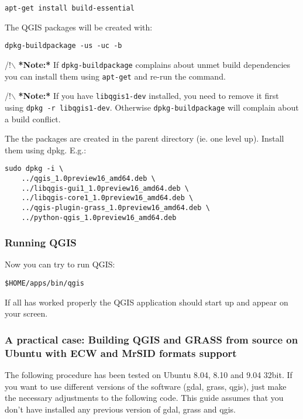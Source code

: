 \begin{verbatim}
apt-get install build-essential
\end{verbatim}

The QGIS packages will be created with:

\begin{verbatim}
dpkg-buildpackage -us -uc -b
\end{verbatim}

/!$\backslash$ \textbf{*Note:*} If \texttt{dpkg-buildpackage} complains about unmet build dependencies
you can install them using \texttt{apt-get} and re-run the command.

/!$\backslash$ \textbf{*Note:*} If you have \texttt{libqgis1-dev} installed, you need to remove it first
using \texttt{dpkg -r libqgis1-dev}.  Otherwise \texttt{dpkg-buildpackage} will complain about a
build conflict.

The the packages are created in the parent directory (ie. one level up).
Install them using dpkg.  E.g.:

\begin{verbatim}
sudo dpkg -i \
	../qgis_1.0preview16_amd64.deb \
	../libqgis-gui1_1.0preview16_amd64.deb \
	../libqgis-core1_1.0preview16_amd64.deb \
	../qgis-plugin-grass_1.0preview16_amd64.deb \
	../python-qgis_1.0preview16_amd64.deb
\end{verbatim}

\subsubsection{Running QGIS}
Now you can try to run QGIS:

\begin{verbatim}
$HOME/apps/bin/qgis 
\end{verbatim}

If all has worked properly the QGIS application should start up and appear
on your screen.

\subsubsection{A practical case: Building QGIS and GRASS from source on Ubuntu with ECW and MrSID formats support}
The following procedure has been tested on Ubuntu 8.04, 8.10 and 9.04 32bit. If you want 
to use different versions of the software (gdal, grass, qgis), just make the 
necessary adjustments to the following code. This guide assumes that you don't have 
installed any previous version of gdal, grass and qgis.

